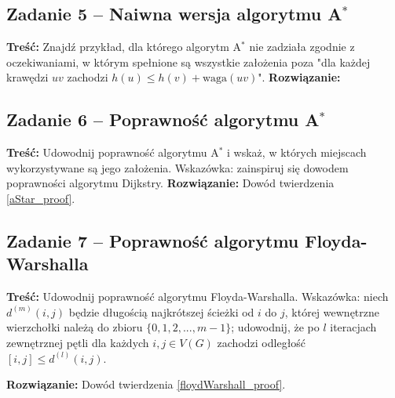 \subsection{Zadanie 5 -- Naiwna wersja algorytmu A\texorpdfstring{$^*$}{TEXT}}
\textbf{Treść: } Znajdź przykład, dla 
którego algorytm A$^*$ nie zadziała zgodnie z oczekiwaniami, 
w którym spełnione
są wszystkie założenia 
poza 
"dla każdej krawędzi $uv$ zachodzi $h(u) \leq h(v) + \text{waga}(uv)$".
\textbf{Rozwiązanie: }

\subsection{Zadanie 6 -- Poprawność algorytmu A\texorpdfstring{$^*$}{TEXT}}
\textbf{Treść: } Udowodnij poprawność algorytmu 
A$^*$ i wskaż, w których miejscach wykorzystywane są jego założenia.
Wskazówka: zainspiruj się dowodem poprawności algorytmu Dijkstry.
\textbf{Rozwiązanie: } Dowód twierdzenia \ref{aStar_proof}.

\subsection{Zadanie 7 -- Poprawność algorytmu Floyda-Warshalla}
\textbf{Treść:} Udowodnij poprawność algorytmu Floyda-Warshalla. 
Wskazówka: niech 
$d^{(m)}(i, j)$ będzie długością
najkrótszej ścieżki od $i$ do $j$, której wewnętrzne wierzchołki należą
do zbioru $\{0, 1, 2, . . . , m - 1\}$; 
udowodnij, że po $l$
iteracjach zewnętrznej pętli dla każdych $i, j \in V (G)$ zachodzi 
odległość$[i, j] \leq d^{(l)}(i, j)$.

\textbf{Rozwiązanie:} Dowód twierdzenia \ref{floydWarshall_proof}.
